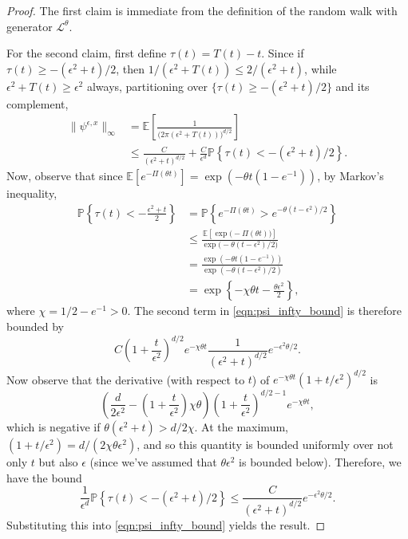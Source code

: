 \documentclass[EJP]{ejpecp} %
\newcommand{\IP}{\mathbb P}
\newcommand{\IE}{\mathbb E}
\begin{document}
\begin{proof}
    The first claim is immediate from the definition of the random walk 
with generator $\mathcal{L}^\theta$.

For the second claim, first define $\tau(t) = T(t)-t$.
Since if $\tau(t) \ge -(\epsilon^2 + t)/2$,
then $1/(\epsilon^2 + T(t)) \le 2/(\epsilon^2 + t)$,
while $\epsilon^2 + T(t) \ge \epsilon^2$ always,
partitioning over
$\{ \tau(t) \ge -(\epsilon^2 + t)/2 \}$ and its complement,
\begin{align}
   \| \psi^{\epsilon,x} \|_\infty
    &=
        \IE\left[ 
            \frac{1}{\big(2 \pi (\epsilon^2+T(t))\big)^{d/2}}
        \right] \nonumber
    \\ & \le
        \frac{C}{(\epsilon^2 + t)^{d/2}}
        + 
        \frac{C}{\epsilon^d}
        \IP\left\{
            \tau(t) < - (\epsilon^2 + t) / 2
        \right\}. \label{eqn:psi_infty_bound}
\end{align}
Now, observe that since $\IE[e^{-\Pi(\theta t)}] = \exp(-\theta t (1 - e^{-1}))$,
by Markov's inequality,
\begin{align}
    \IP\left\{
        \tau(t) < - \frac{\epsilon^2 + t}{2}
    \right\}
    &=
    \IP\left\{
        e^{-\Pi(\theta t)} > e^{-\theta (t - \epsilon^2) / 2}
    \right\}
\nonumber
\\
&\leq \frac{\IE[\exp\big(-\Pi(\theta t)\big)]}{\exp\big(-\theta(t-\epsilon^2)/2\big)}
\nonumber
    \\&=
    \frac{
        \exp(- \theta t(1 - e^{-1}))
    }{
        \exp(- \theta (t - \epsilon^2) / 2)
    }
\nonumber
    \\&=
    \exp\left\{ - \chi \theta t - \frac{\theta \epsilon^2}{2} \right\} ,
\label{bound for negative tau}
\end{align}
where $\chi = 1/2 - e^{-1} > 0$.
The second term in \eqref{eqn:psi_infty_bound} is therefore bounded by
\[
	C \left(1 + \frac{t}{\epsilon^2}\right)^{d/2} e^{-\chi \theta t }%
	\frac{1}{(\epsilon^2 + t)^{d/2}}e^{-\epsilon^2 \theta/2} .
\]
Now observe that the derivative (with respect to $t$) of 
	$e^{-\chi \theta t} %
	(1 + t/\epsilon^2)^{d/2}$ 
is
\[
    \left( \frac{d}{2 \epsilon^2} - \left(1 + \frac{t}{\epsilon^2}\right) \chi \theta \right)
    \left( 1 + \frac{t}{\epsilon^2} \right)^{d/2 - 1} e^{-\chi \theta t },%
\]
which is negative if $\theta(\epsilon^2 + t) > d/2 \chi$.
At the maximum, %
$(1 + t/\epsilon^2) = d /(2\chi \theta \epsilon^2)$,
and so this quantity is bounded uniformly over not only $t$ but also $\epsilon$
(since we've assumed that $\theta \epsilon^2$ is bounded below).
Therefore, 
we have the bound
\begin{equation}
	\label{small tau bound}
	\frac{1}{\epsilon^d}
        \IP\left\{
            \tau(t) < - (\epsilon^2 + t) / 2
        \right\}
\leq \frac{C}{(\epsilon^2 + t)^{d/2}} e^{-\epsilon^2\theta/2}.
\end{equation}
Substituting this into \eqref{eqn:psi_infty_bound} yields the result.
\end{proof}
\end{document}
